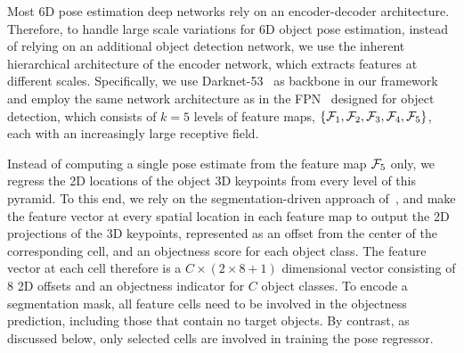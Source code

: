 Most 6D pose estimation deep networks rely on an encoder-decoder architecture. Therefore, to handle large scale variations for 6D object pose estimation, instead of relying on an additional object detection network, we use the inherent hierarchical architecture of the encoder network, which extracts features at different scales. Specifically, we use Darknet-53~\cite{Redmon18} as backbone in our framework and employ the same network architecture as in the FPN~\cite{Lin17e} designed for object detection, which consists of $k=5$ levels of feature maps, $\{{\cal F}_1, {\cal F}_2, {\cal F}_3, {\cal F}_4, {\cal F}_5\}$, each with an increasingly large receptive field. 


Instead of computing a single pose estimate from the feature map ${\cal F}_5$ only, we regress the 2D locations of the object 3D keypoints from every level of this pyramid. 
To this end, we rely on the segmentation-driven approach of~\cite{Hu19a}, and make the feature vector at every spatial location in each feature map to output the 2D projections of the 3D keypoints, represented as an offset from the center of the corresponding cell, and an objectness score for each object class. The feature vector at each cell therefore is a $C\times (2\times 8+1)$ dimensional vector consisting of $8$ 2D offsets and an objectness indicator for $C$ object classes. To encode a segmentation mask, all feature cells need to be involved in the objectness prediction, including those that contain no target objects. By contrast, as discussed below, only selected cells are involved in training the pose regressor.


